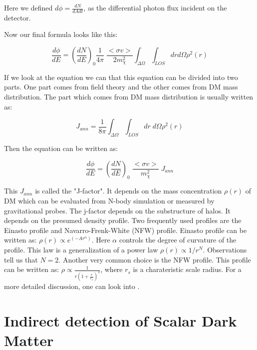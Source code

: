 \documentclass[12pt]{report}
\begin{document}
Here we defined $d\phi= \frac{dN}{dA dt}$, as the differential photon flux incident on the detector.

Now our final formula looks like this:





\begin{equation}
\frac{d\phi}{dE} = \left(\frac{dN}{dE}\right)_0 \frac{1}{4 \pi}\; \frac{<\sigma v> }{2 m^2_\chi} \int_{\Delta\Omega} \int_{LOS} dr d\Omega \rho^2(r) \label{indeq}
\end{equation}






If we look at the equation we can that this equation can be divided into two parts. One part comes from field theory and the other comes from DM mass distribution.
The part which comes from DM mass distribution is usually written as: 




$$J_{ann}= \frac{1}{8 \pi} \int_{\Delta \Omega} \int_{LOS} dr\;d\Omega \rho^2(r)$$




Then the equation can be written as:

\begin{equation}
\frac{d\phi}{dE} = \left(\frac{dN}{dE}\right)_0 \; \frac{<\sigma v> }{m^2_\chi}\; J_{ann}
\end{equation}

This $J_{ann}$ is called the "J-factor". It depends on the mass concentration $\rho(r)$ of DM which can be evaluated from N-body simulation or measured by gravitational probes. The j-factor depends on the substructure of halos. It depends on the presumed density profile. Two frequently used profiles are the Einasto profile and Navarro-Frenk-White (NFW) profile. Einasto profile can be written as: $\rho(r) \propto e^{(-Ar^\alpha)}$. Here $\alpha$ controls the degree of curvature of the profile. This law is a generalization of a power law $\rho(r) \propto {1}/{r^N}$. Observations tell us that $N=2$. Another very common choice is the NFW profile. This profile can be written as: $\rho \propto \frac{1}{r(1+ \frac{r}{r_s})^2}$, where $r_s$ is a charateristic scale radius. For a more detailed discussion, one can look into \cite{tasilecture} \cite{indtools}.





\chapter{Indirect detection of Scalar Dark Matter}
\end{document}
